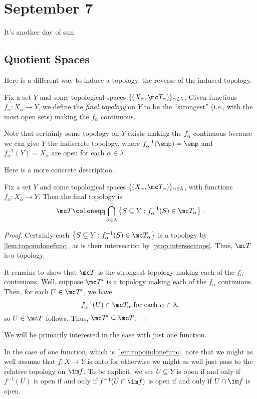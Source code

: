 \documentclass[../notes.tex]{subfiles}
\begin{document}
\section{September 7}

It's another day of sun.

\subsection{Quotient Spaces}
Here is a different way to induce a topology, the reverse of the induced topology.
\begin{defihelper} 
	Fix a set $Y$ and some topological spaces $\{(X_\alpha,\mc T_\alpha)\}_{\alpha\in\lambda}$. Given functions $f_\alpha\colon X_\alpha\to Y$, we define the \textit{final topology} on $Y$ to be the ``strongest'' (i.e., with the most open sets) making the $f_\alpha$ continuous.
\end{defihelper}
\begin{remark}
	Note that certainly some topology on $Y$ exists making the $f_\alpha$ continuous because we can give $Y$ the indiscrete topology, where $f_\alpha^{-1}(\emp)=\emp$ and $f_\alpha^{-1}(Y)=X_\alpha$ are open for each $\alpha\in\lambda$.
\end{remark}
Here is a more concrete description.
\begin{lemma}
	Fix a set $Y$ and some topological spaces $\{(X_\alpha,\mc T_\alpha)\}_{\alpha\in\lambda}$, with functions $f_\alpha\colon X_\alpha\to Y$. Then the final topology is
	\[\mc T\coloneqq\bigcap_{\alpha\in\lambda}\left\{S\subseteq Y:f^{-1}_\alpha(S)\in\mc T_\alpha\right\}.\]
\end{lemma}
\begin{proof}
	Certainly each $\left\{S\subseteq Y:f^{-1}_\alpha(S)\in\mc T_\alpha\right\}$ is a topology by \autoref{lem:topoindonefunc}, as is their intersection by \autoref{prop:intersecttops}. Thus, $\mc T$ is a topology.
	
	It remains to show that $\mc T$ is the strongest topology making each of the $f_\alpha$ continuous. Well, suppose $\mc T'$ is a topology making each of the $f_\alpha$ continuous. Then, for each $U\in\mc T'$, we have
	\[f_\alpha^{-1}(U)\in\mc T_\alpha\text{ for each }\alpha\in\lambda,\]
	so $U\in\mc T$ follows. Thus, $\mc T'\subseteq\mc T$.
\end{proof}
We will be primarily interested in the case with just one function.
\begin{remark}
	In the case of one function, which is \autoref{lem:topoindonefunc}, note that we might as well assume that $f\colon X\to Y$ is onto for otherwise we might as well just pass to the relative topology on $\im f$. To be explicit, we see $U\subseteq Y$ is open if and only if $f^{-1}(U)$ is open if and only if $f^{-1}(U\cap\im f)$ is open if and only if $U\cap\im f$ is open.
\end{remark}
\end{document}
